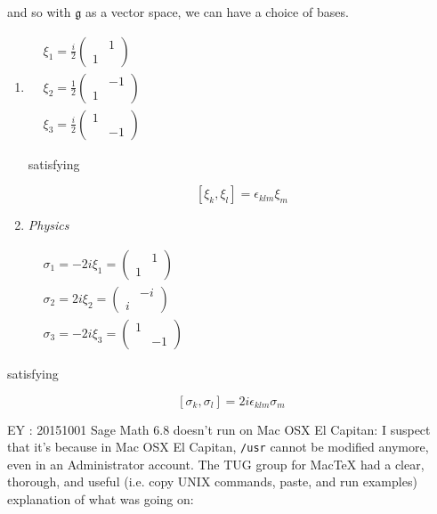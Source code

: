 and so with $\mathfrak{g}$ as a vector space, we can have a choice of bases.  

\begin{enumerate}
	\item[(a)] $\begin{aligned}
	& \xi_1 = \frac{i}{2} \left( \begin{matrix} & 1 \\ 1 & \end{matrix} \right) \\ 
	& \xi_2 = \frac{1}{2} \left( \begin{matrix} & -1 \\ 1 & \end{matrix} \right) \\
	& \xi_3 = \frac{i}{2} \left( \begin{matrix} 1 &  \\  & -1 \end{matrix} \right) 
	\end{aligned}$
	
	satisfying 
	
	\[
	[\xi_k , \xi_l ] = \epsilon_{klm} \xi_m
	\]
	\item[(b)] \emph{Physics}
	
	$\begin{aligned}
	& \sigma_1 = -2i \xi_1 =  \left( \begin{matrix} & 1 \\ 1 & \end{matrix} \right) \\ 
	& \sigma_2 = 2i \xi_2 =  \left( \begin{matrix} & -i \\ i & \end{matrix} \right) \\
	& \sigma_3 = -2i \xi_3 =  \left( \begin{matrix} 1 &  \\  & -1 \end{matrix} \right) 
	\end{aligned}$
\end{enumerate}

satisfying 

\[
[ \sigma_k, \sigma_l ] = 2i \epsilon_{klm} \sigma_m
\]

EY : 20151001 Sage Math 6.8 doesn't run on Mac OSX El Capitan: I suspect that it's because in Mac OSX El Capitan, \verb|/usr| cannot be modified anymore, even in an Administrator account.  The TUG group for MacTeX had a clear, thorough, and useful (i.e. copy UNIX commands, paste, and run examples) explanation of what was going on:

